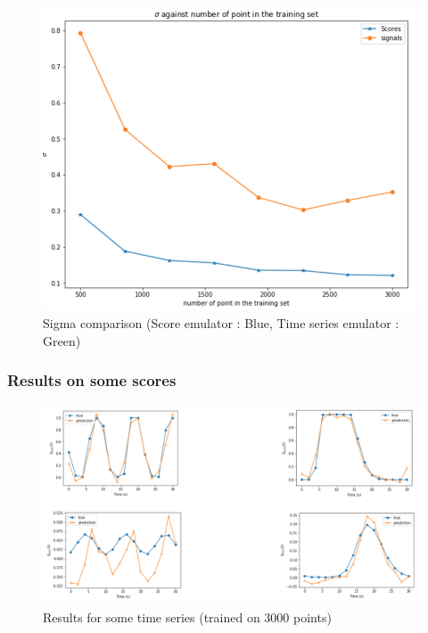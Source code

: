 \documentclass{article}
\begin{document}
\begin{figure}[H]
\centering
\includegraphics[scale=0.55]{image/variance_reduction_comparison.png}
\caption{Sigma comparison (Score emulator : Blue, Time series emulator : Green)}
\label{fig: variance comparison}
\end{figure}


\subsubsection{Results on some scores}

\begin{figure}[H]
\centering
\includegraphics[scale=0.4]{image/examples_on_scores.png}
\caption{Results for some time series (trained on 3000 points)}
\label{fig: variance comparison}
\end{figure}
\end{document}
